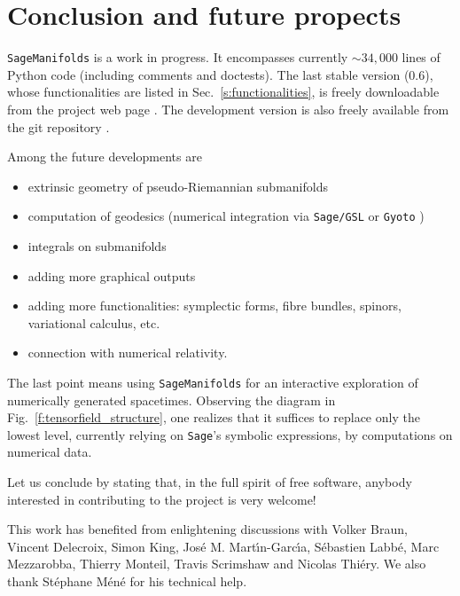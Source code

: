 \documentclass[a4paper]{jpconf}
\newcommand{\soft}[1]{\texttt{#1}}
\newcommand{\Sage}{\soft{Sage}}
\newcommand{\SM}{\soft{SageManifolds}}
\begin{document}

\section{Conclusion and future propects}

\SM{} is a work in progress. 
It encompasses currently $\sim 34,000$ lines of Python code (including comments and 
doctests). 
The last stable version (0.6), whose functionalities are 
listed in Sec.~\ref{s:functionalities},
is freely downloadable from the project web page
\cite{SM}. The development version is also freely available 
from the git repository \cite{SM_git}.

Among the future developments are 
\begin{itemize}
\item extrinsic geometry of pseudo-Riemannian submanifolds
\item computation of geodesics (numerical integration via \soft{Sage/GSL} or 
\soft{Gyoto} \cite{Gyoto})
\item integrals on submanifolds
\item adding more graphical outputs
\item adding more functionalities: symplectic forms, fibre bundles, 
spinors, variational calculus, etc.
\item connection with numerical relativity.
\end{itemize}
The last point means using \SM{} for an interactive exploration 
of numerically generated spacetimes. Observing
the diagram in Fig.~\ref{f:tensorfield_structure}, one realizes that it 
suffices to replace only the lowest level, currently relying on
\Sage{}'s symbolic expressions, by computations on numerical data. 

Let us conclude by stating that, in the full spirit of free software, 
anybody interested in contributing to the project is very welcome!


\ack
This work has benefited from enlightening discussions with Volker Braun,
Vincent Delecroix, Simon King,  Jos\'e M. Mart\'\i n-Garc\'\i a, 
S\'ebastien Labb\'e,
Marc Mezzarobba, Thierry Monteil, Travis Scrimshaw and Nicolas Thi\'ery. 
We also thank St\'ephane M\'en\'e for his technical help. 
 
\end{document}
